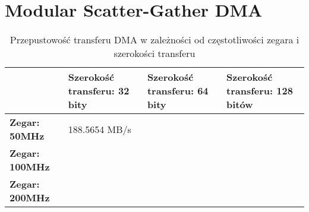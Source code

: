 \chapter{Modular Scatter-Gather DMA}

\begin{table}[h]
    \centering
    \begin{tabular}{|l|p{3.5cm}|p{3.5cm}|p{3.5cm}|}
    \hline
     & \textbf{Szerokość transferu: 32 bity} & \textbf{Szerokość transferu: 64 bity} & \textbf{Szerokość transferu: 128 bitów} \\ \hline
    \textbf{Zegar: 50MHz} & {188.5654 MB/s}  &  &  \\ \hline
    \textbf{Zegar: 100MHz} &  &  &  \\ \hline
    \textbf{Zegar: 200MHz} &  &  &  \\ \hline
    \end{tabular}
    \caption{Przepustowość transferu DMA w zależności od częstotliwości zegara i szerokości transferu}
    \label{tab:my_label}
    \end{table}